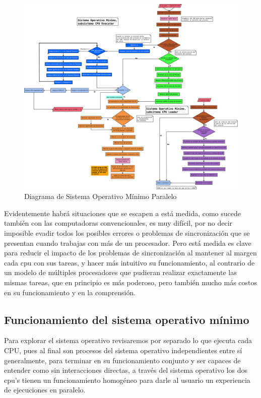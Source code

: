 \documentclass[letterpaper,12pt,oneside]{book}
\begin{document}
	 		

			\begin{figure}[h]		
				\centering
				\includegraphics[width=\textwidth,height=\textheight,keepaspectratio]{media/Paralela/Diagrama_Flujo_SO_Parallel.eps}
				\caption{ Diagrama de Sistema Operativo Mínimo Paralelo }
				\label{fig:diag_so_parallel}
			\end{figure}	 	
	 	
     		Evidentemente habrá situaciones que se escapen a está medida, como sucede también con las computadoras convencionales, es muy difícil, por
     		no decir imposible evadir todos los posibles errores o problemas de sincronización que se presentan cuando trabajas con más de un procesador. Pero está medida 
     		es clave para reducir el impacto de los problemas de sincronización al mantener al margen cada cpu con sus tareas, y hacer más intuitivo su funcionamiento,
     		al contrario de un modelo de múltiples procesadores que pudieran realizar exactamente las mismas tareas, que en principio es más poderoso, pero
     		también mucho más costos en su funcionamiento y en la comprensión.
	 	\clearpage
	 	\subsection{Funcionamiento del sistema operativo mínimo}
			
			Para explorar el sistema operativo revisaremos por separado lo que ejecuta cada CPU, pues al final son procesos
			del sistema operativo independientes entre sí generalmente, para terminar en su funcionamiento conjunto y ser capaces
			de entender como sin interacciones directas, a través del sistema operativo los dos cpu's tienen un funcionamiento homogéneo para
			darle al usuario un experiencia de ejecuciones en paralelo.
			
\end{document}
